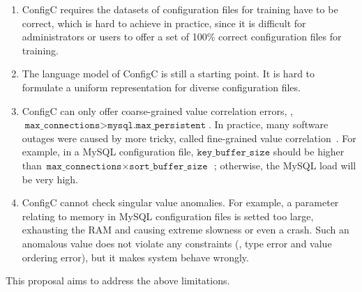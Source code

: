 \begin{enumerate}

\item ConfigC requires the datasets of configuration files for training 
  have to be correct, which is hard to achieve in practice, since 
  it is difficult for administrators or users to offer a
  set of 100\% correct configuration files for training.

\item The language model of ConfigC is still a starting point. It
  is hard to formulate a uniform representation for diverse
  configuration files.

\item ConfigC can only offer coarse-grained value correlation errors,
  \eg, $\texttt{max\_connections} > \texttt{mysql.max\_persistent}$.
  In practice, many software outages were caused by more tricky, called
  fine-grained value correlation~\cite{correlation}. For example, 
  in a MySQL configuration file, $\texttt{key\_buffer\_size}$ should be 
  higher than $\texttt{max\_connections} \times 
  \texttt{sort\_buffer\_size}$~\cite{correlation};
  otherwise, the MySQL load will be very high.

\item ConfigC cannot check singular value anomalies. For example,
  a parameter relating to memory in MySQL configuration files is
  setted too large, exhausting the RAM and causing extreme slowness
  or even a crash. Such an anomalous value does not violate any
  constraints (\eg, type error and value ordering error), but 
  it makes system behave wrongly.

\end{enumerate}

This proposal aims to address the above limitations. 
